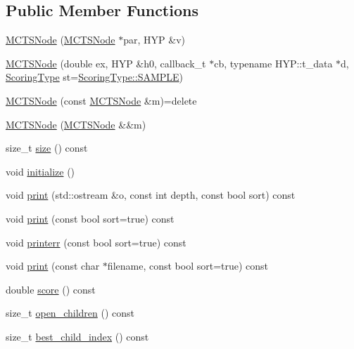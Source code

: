 \subsection*{Public Member Functions}
\begin{DoxyCompactItemize}
\item 
\hyperlink{class_m_c_t_s_node_aacbf672bfe2acc5ad2396a021d1b2d03}{M\+C\+T\+S\+Node} (\hyperlink{class_m_c_t_s_node}{M\+C\+T\+S\+Node} $\ast$par, H\+YP \&v)
\item 
\hyperlink{class_m_c_t_s_node_aeb45ef5d519e94298c4a6f6169287b15}{M\+C\+T\+S\+Node} (double ex, H\+YP \&h0, callback\+\_\+t $\ast$cb, typename H\+Y\+P\+::t\+\_\+data $\ast$d, \hyperlink{class_m_c_t_s_node_a5a201dc80c97c1b65503161f7e5603f6}{Scoring\+Type} st=\hyperlink{class_m_c_t_s_node_a5a201dc80c97c1b65503161f7e5603f6af5a2496cf66cb8cffe66cb1b27d7dede}{Scoring\+Type\+::\+S\+A\+M\+P\+LE})
\item 
\hyperlink{class_m_c_t_s_node_a6c20efdd42178c22ad3f34446150b705}{M\+C\+T\+S\+Node} (const \hyperlink{class_m_c_t_s_node}{M\+C\+T\+S\+Node} \&m)=delete
\item 
\hyperlink{class_m_c_t_s_node_af737d4dda4132092ab99d0ef4254c856}{M\+C\+T\+S\+Node} (\hyperlink{class_m_c_t_s_node}{M\+C\+T\+S\+Node} \&\&m)
\item 
size\+\_\+t \hyperlink{class_m_c_t_s_node_a9e6997465d24c26cadd556346d722959}{size} () const
\item 
void \hyperlink{class_m_c_t_s_node_ad0644bc487fe620c67a3c8fb4a609ac2}{initialize} ()
\item 
void \hyperlink{class_m_c_t_s_node_ae672141481eb0da89defec2c562b95e1}{print} (std\+::ostream \&o, const int depth, const bool sort) const
\item 
void \hyperlink{class_m_c_t_s_node_a35f1dd261e8d76f652c21a53ac78137c}{print} (const bool sort=true) const
\item 
void \hyperlink{class_m_c_t_s_node_aabe3f97545bc6e46220fef78537882ec}{printerr} (const bool sort=true) const
\item 
void \hyperlink{class_m_c_t_s_node_ac49067508200793a8cb63524114b5c01}{print} (const char $\ast$filename, const bool sort=true) const
\item 
double \hyperlink{class_m_c_t_s_node_acd7b0a82ce6fce44bff99a844ccfee32}{score} () const
\item 
size\+\_\+t \hyperlink{class_m_c_t_s_node_a678226e918e97f7b83821c9196cb84d4}{open\+\_\+children} () const
\item 
size\+\_\+t \hyperlink{class_m_c_t_s_node_af2b12868a41dcce77a34283be4baf4fa}{best\+\_\+child\+\_\+index} () const

\end{DoxyCompactItemize}
